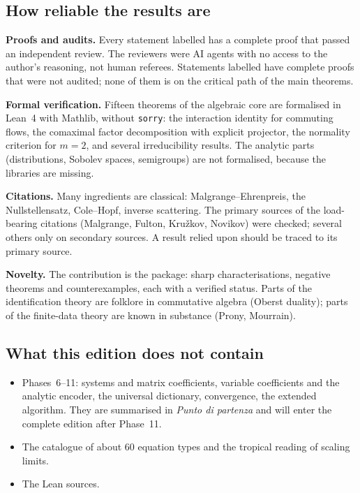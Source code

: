 \subsection{How reliable the results are}

\textbf{Proofs and audits.} Every statement labelled \proved{} has a complete proof that passed an independent review. The reviewers were AI agents with no access to the author's reasoning, not human referees. Statements labelled \pw{} have complete proofs that were not audited; none of them is on the critical path of the main theorems.

\textbf{Formal verification.} Fifteen theorems of the algebraic core are formalised in Lean~4 with Mathlib, without \texttt{sorry}: the interaction identity for commuting flows, the comaximal factor decomposition with explicit projector, the normality criterion for $m=2$, and several irreducibility results. The analytic parts (distributions, Sobolev spaces, semigroups) are not formalised, because the libraries are missing.

\textbf{Citations.} Many ingredients are classical: Malgrange--Ehrenpreis, the Nullstellensatz, Cole--Hopf, inverse scattering. The primary sources of the load-bearing citations (Malgrange, Fulton, Kru\v zkov, Novikov) were checked; several others only on secondary sources. A result relied upon should be traced to its primary source.

\textbf{Novelty.} The contribution is the package: sharp characterisations, negative theorems and counterexamples, each with a verified status. Parts of the identification theory are folklore in commutative algebra (Oberst duality); parts of the finite-data theory are known in substance (Prony, Mourrain).

\subsection{What this edition does not contain}

\begin{itemize}
\item Phases~6--11: systems and matrix coefficients, variable coefficients and the analytic encoder, the universal dictionary, convergence, the extended algorithm. They are summarised in \emph{Punto di partenza} and will enter the complete edition after Phase~11.
\item The catalogue of about $60$ equation types and the tropical reading of scaling limits.
\item The Lean sources.
\end{itemize}

